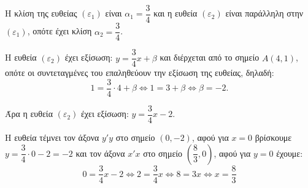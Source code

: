 
\begin{alist}
\item Η κλίση της ευθείας $(\varepsilon_1)$ είναι $\alpha_1 = \dfrac{3}{4}$ και η ευθεία $(\varepsilon_2)$ είναι παράλληλη στην $(\varepsilon_1)$, οπότε έχει κλίση $\alpha_2 = \dfrac{3}{4}$.

\item Η ευθεία $(\varepsilon_2)$ έχει εξίσωση: $y = \dfrac{3}{4}x + \beta$ και διέρχεται από το σημείο $A(4, 1)$, οπότε οι συντεταγμένες του επαληθεύουν την εξίσωση της ευθείας, δηλαδή:
\[1 = \dfrac{3}{4} \cdot 4 + \beta \Leftrightarrow 1 = 3 + \beta \Leftrightarrow \beta = -2.\]

Άρα η ευθεία $(\varepsilon_2)$ έχει εξίσωση: $y = \dfrac{3}{4}x - 2$.

\item Η ευθεία τέμνει τον άξονα $y'y$ στο σημείο $(0, -2)$, αφού για $x = 0$ βρίσκουμε
$y = \dfrac{3}{4} \cdot 0 - 2 = -2$ 
και τον άξονα $x'x$ στο σημείο $\left(\dfrac{8}{3}, 0\right)$, αφού για $y = 0$ έχουμε:
\[0 = \dfrac{3}{4}x - 2 \Leftrightarrow 2 = \dfrac{3}{4}x \Leftrightarrow 8 = 3x \Leftrightarrow x = \dfrac{8}{3}\]
\end{alist}

